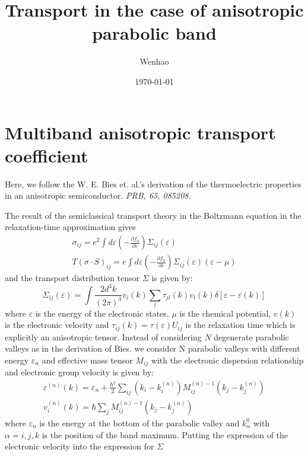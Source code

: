 \documentclass{article}
\newcommand{\pfrac}[2]{\frac{\partial #1}{\partial #2}}
\begin{document}
\title{Transport in the case of anisotropic parabolic band}
\author{Wenhao}
\date{\today}
\maketitle

\section{Multiband anisotropic transport coefficient}
Here, we follow the W. E. Bies et. al.'s derivation of the 
thermoelectric properties in an anisotropic semiconductor.
\emph{PRB, 65, 085208}. 

The result of the semiclassical transport theory in the Boltzmann 
equation in the relaxation-time approximation gives
\begin{gather}
    \sigma_{ij} = e^2\int d\varepsilon \left( -\pfrac{f_0}{\varepsilon} \right) \Sigma_{ij}(\varepsilon) \\
    T(\sigma \cdot S)_{ij} = e\int d\varepsilon \left(-\pfrac{f_0}{\varepsilon}\right) 
                                \Sigma_{ij}(\varepsilon) (\varepsilon - \mu)     
\end{gather}
and the transport distribution tensor $\Sigma$ is given by:
\begin{equation}
    \Sigma_{ij}(\varepsilon) = \int \frac{2d^3k}{(2\pi)^3} v_i(k) \sum_l \tau_{jl}(k)v_l(k) \delta[\varepsilon - \varepsilon(k)]
\end{equation}
where $\varepsilon$ is the energy of the electronic states, $\mu$ is the chemical potential, 
$v(k)$ is the electronic velocity and $\tau_{ij}(k) = \tau(\varepsilon)U_{ij}$ 
is the relaxation time which is explicitly
an anisotropic tensor. 
Instead of considering $N$ degenerate parabolic valleys as in the derivation of Bies. 
we consider N parabolic valleys with different energy $\varepsilon_n$ and effective mass 
tensor $M_{ij}$ with the electronic dispersion relationship and 
electronic group velocity is given by:
\begin{gather}
    \varepsilon^{(n)}(k) = \varepsilon_n + 
        \frac{\hbar^2}{2} \sum_{ij} (k_i - k_i^{(n)}) M_{ij}^{(n)-1} (k_j - k_j^{(n)}) \\
    v_i^{(n)}(k) = \hbar\sum_j M_{ij}^{(n)-1} (k_j - k_j^{(n)})
\end{gather}
where $\varepsilon_n$ is the energy at the bottom of the parabolic valley and 
$k_{\alpha}^0$ with $\alpha = i,j,k$ is the position of the band maximum. 
Putting the expression of the electronic velocity into the expression for $\Sigma$
\end{document}
